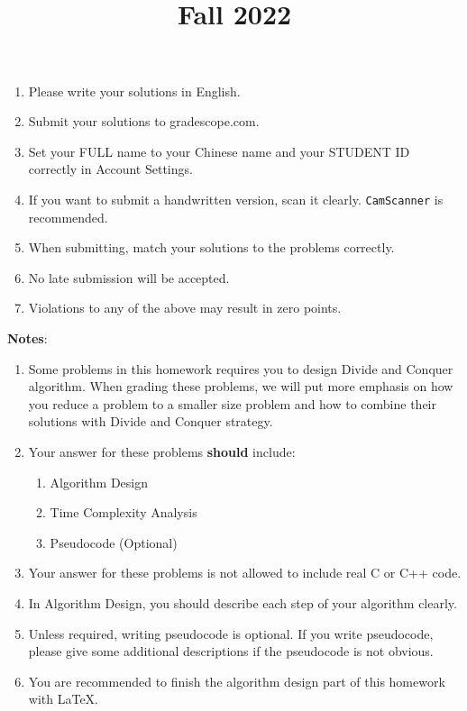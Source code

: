 \documentclass[11pt, addpoints, answers]{exam}
\title{
	\CourseName\\
	Fall 2022\\
	\HomeworkNO
}
\author{}
\date{\DueDate}
\newcommand{\ttt}{\texttt}
\begin{document}
\maketitle

\begin{enumerate}
	\item Please write your solutions in English.
	\item Submit your solutions to gradescope.com.
	\item Set your FULL name to your Chinese name and your STUDENT ID correctly in Account Settings.
	\item If you want to submit a handwritten version, scan it clearly. \ttt{CamScanner} is recommended.
	\item When submitting, match your solutions to the problems correctly.
	\item No late submission will be accepted.
	\item Violations to any of the above may result in zero points.
\end{enumerate}

\newpage


{\large\textbf{Notes}:}

\begin{enumerate}
	\item Some problems in this homework requires you to design Divide and Conquer algorithm. When grading these problems, we will put more emphasis on how you reduce a problem to a smaller size problem and how to combine their solutions with Divide and Conquer strategy. 
	\item Your answer for these problems {\color{red}\textbf{should}} include:
	\begin{enumerate}
		\item {\color{red}Algorithm Design}
		\item {\color{red}Time Complexity Analysis}
		\item Pseudocode (Optional)
	\end{enumerate}
    \item Your answer for these problems is {\color{red}not allowed to include real C or C++ code}.
	\item In Algorithm Design, you should describe each step of your algorithm clearly.
	\item Unless required, writing pseudocode is optional. If you write pseudocode, please give some additional descriptions if the pseudocode is not obvious.
	\item You are recommended to finish the algorithm design part of this homework with \LaTeX.
\end{enumerate}
\end{document}

